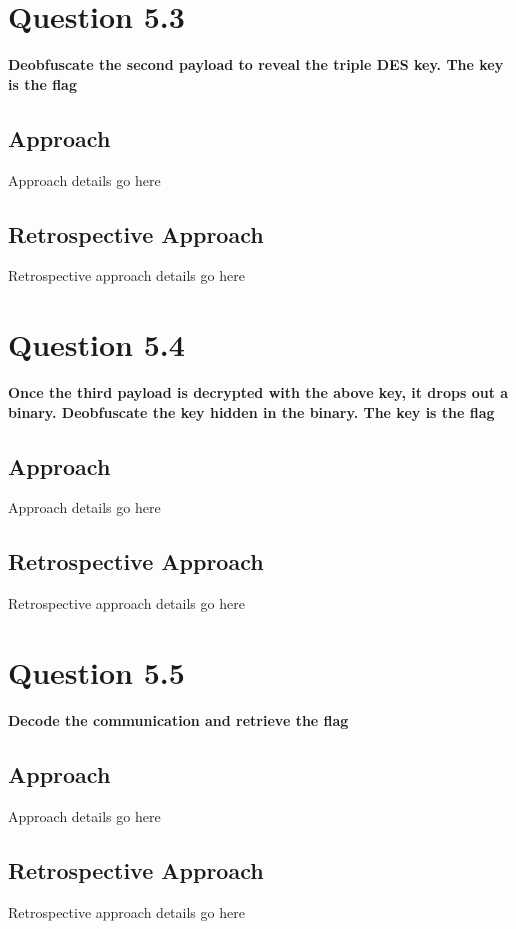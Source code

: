 \section{Question 5.3}
\textbf{Deobfuscate the second payload to reveal the triple DES key. The key is
the flag}
\subsection{Approach}
Approach details go here
\subsection{Retrospective Approach}
Retrospective approach details go here

\section{Question 5.4}
\textbf{Once the third payload is decrypted with the above key, it drops out a
binary. Deobfuscate the key hidden in the binary. The key is the flag}
\subsection{Approach}
Approach details go here
\subsection{Retrospective Approach}
Retrospective approach details go here

\section{Question 5.5}
\textbf{Decode the communication and retrieve the flag}
\subsection{Approach}
Approach details go here
\subsection{Retrospective Approach}
Retrospective approach details go here
